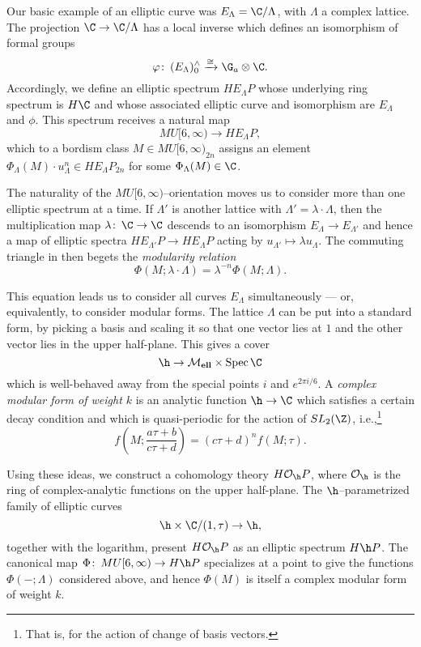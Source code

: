 \begin{example}
Our basic example of an elliptic curve was $E_\Lambda = \C / \Lambda$, with $\Lambda$ a complex lattice.  The projection $\C \to \C / \Lambda$ has a local inverse which defines an isomorphism of formal groups \[\phi\co (E_\Lambda)^\wedge_0 \xrightarrow{\cong} \G_a \otimes \C.\]  Accordingly, we define an elliptic spectrum $HE_\Lambda P$ whose underlying ring spectrum is $H\C$ and whose associated elliptic curve and isomorphism are $E_\Lambda$ and $\phi$.  This spectrum receives a natural map \[MU[6, \infty) \to HE_\Lambda P,\] which to a bordism class $M \in MU[6, \infty)_{2n}$ assigns an element $\Phi_\Lambda(M) \cdot u_\Lambda^n \in HE_\Lambda P_{2n}$  for some $\Phi_\Lambda(M) \in \C$.
\end{example}

\begin{example}
The naturality of the $MU[6, \infty)$--orientation moves us to consider more than one elliptic spectrum at a time.  If $\Lambda'$ is another lattice with $\Lambda' = \lambda \cdot \Lambda$, then the multiplication map $\lambda\co \C \to \C$ descends to an isomorphism $E_\Lambda \to E_{\Lambda'}$ and hence a map of elliptic spectra $HE_{\Lambda'}P \to HE_\Lambda P$ acting by $u_{\Lambda'} \mapsto \lambda u_\Lambda$.  The commuting triangle in  then begets the \emph{modularity relation} \[\Phi(M; \lambda \cdot \Lambda) = \lambda^{-n} \Phi(M; \Lambda).\]
\end{example}

\begin{example}\label{OrdinaryHomologyInUpperHalfPlaneEx}
This equation leads us to consider all curves $E_\Lambda$ simultaneously --- or, equivalently, to consider modular forms.  The lattice $\Lambda$ can be put into a standard form, by picking a basis and scaling it so that one vector lies at $1$ and the other vector lies in the upper half-plane.  This gives a cover \[\h \to \moduli{ell} \times \Spec \C\] which is well-behaved away from the special points $i$ and $e^{2 \pi i / 6}$.  A \textit{complex modular form of weight $k$} is an analytic function $\h \to \C$ which satisfies a certain decay condition and which is quasi-periodic for the action of $SL_2(\Z)$, i.e.,\footnote{That is, for the action of change of basis vectors.} \[f\left(M; \frac{a \tau + b}{c \tau + d} \right) = (c \tau + d)^n f(M; \tau).\]

Using these ideas, we construct a cohomology theory $H \sheaf O_{\h} P$, where $\sheaf O_{\h}$ is the ring of complex-analytic functions on the upper half-plane.  The $\h$--parametrized family of elliptic curves \[\h \times \C / (1, \tau) \to \h,\] together with the logarithm, present $H \sheaf O_{\h} P$ as an elliptic spectrum $H\h P$.  The canonical map $\Phi\co MU[6, \infty) \to H\h P$ specializes at a point to give the functions $\Phi(-; \Lambda)$ considered above, and hence $\Phi(M)$ is itself a complex modular form of weight $k$.
\end{example}

